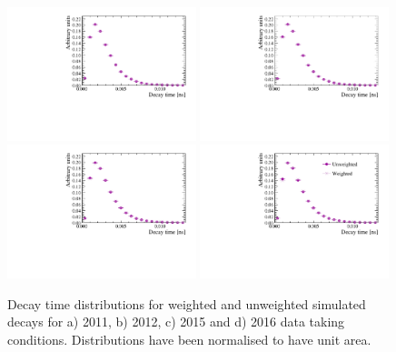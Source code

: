 \begin{figure}[tbp]
  \centering
    \includegraphics[width=0.49\textwidth]{./Figs/LifetimeMeasurement/2011_DT_Bs2MuMu.pdf}
    \includegraphics[width=0.49\textwidth]{./Figs/LifetimeMeasurement/2012_DT_Bs2MuMu.pdf}
    \includegraphics[width=0.49\textwidth]{./Figs/LifetimeMeasurement/2015_DT_Bs2MuMu.pdf}
    \includegraphics[width=0.49\textwidth]{./Figs/LifetimeMeasurement/2016_DT_Bs2MuMu.pdf}
  \caption{Decay time distributions for weighted and unweighted \bsmumu simulated decays for a) 2011, b) 2012, c) 2015 and d) 2016 data taking conditions. Distributions have been normalised to have unit area.}
  \label{fig:BsmmDT}
\end{figure}

